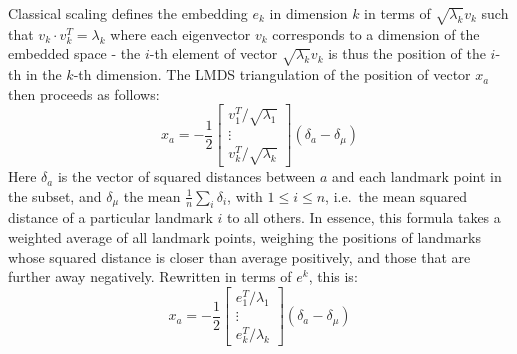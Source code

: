 \documentclass[10pt,fleqn,a4paper]{article}
\begin{document}
\begin{twocolumn}
Classical scaling defines the embedding $e_k$ in dimension $k$ in terms of $\sqrt{\lambda_k} v_k$ such that $v_k \cdot v_k^T = \lambda_k$ where each eigenvector $v_k$ corresponds to a dimension of the embedded space - the $i$-th element of vector $\sqrt{\lambda_k} v_k$ is thus the position of the $i$-th in the $k$-th dimension.  The LMDS triangulation of the position of vector $x_a$ then proceeds as follows:
%
\begin{equation}
x_a = -\frac{1}{2} \begin{bmatrix} v_1^T / \sqrt{\lambda_1} \\ \vdots \\ v_k^T / \sqrt{\lambda_k} \end{bmatrix} (\delta_a - \delta_\mu) \label{triangFormula}
\end{equation}
%
Here $\delta_a$ is the vector of squared distances between $a$ and each landmark point in the subset, and $\delta_\mu$ the mean $\frac{1}{n}\sum_i\delta_i$, with $1 \leq i \leq n$, i.e.\ the mean squared distance of a particular landmark $i$ to all others.  In essence, this formula takes a weighted average of all landmark points, weighing the positions of landmarks whose squared distance is closer than average positively, and those that are further away negatively.  Rewritten in terms of $e^k$, this is:
%
\begin{equation}
x_a = -\frac{1}{2} \begin{bmatrix} e_1^T / \lambda_1 \\ \vdots \\ e_k^T / \lambda_k \end{bmatrix} (\delta_a - \delta_\mu)
\end{equation}  
%

\end{twocolumn}
\end{document}
